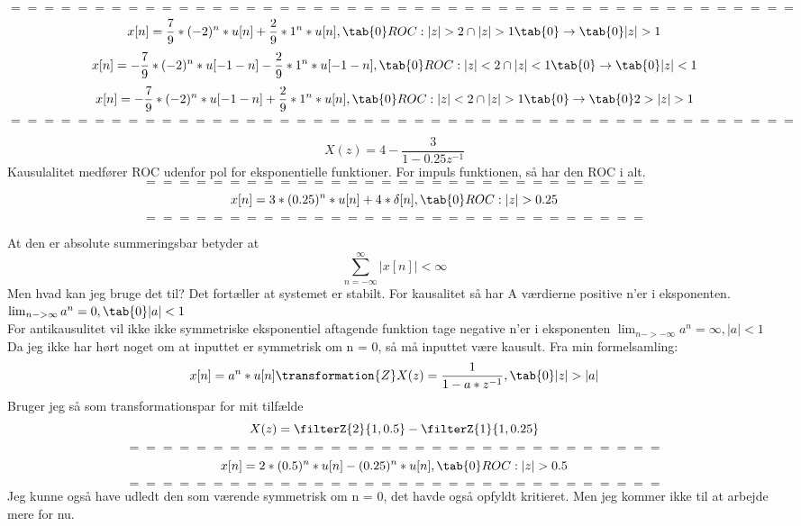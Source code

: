 \begin{Opgaver}
\begin{kapitel}[Z transformation]
\begin{Opgave}
\begin{UnderOpgave}[\text{$X(z) = \filterZ{1, -1/3}{1, 1, -2}$, Alle ROCs skal findes}]
                \[===============================================\] 
                \[x[n] = \frac{7}{9} * (-2)^n * u[n]        + \frac{2}{9} * 1^n * u[n]   , \tab{0} ROC: |z| > 2 \cap |z| > 1 \tab{0} \rightarrow \tab{0} |z| > 1\]
                \[x[n] = -\frac{7}{9} * (-2)^n * u[-1 -n]   - \frac{2}{9} * 1^n * u[-1-n], \tab{0} ROC: |z| < 2 \cap |z| < 1 \tab{0} \rightarrow \tab{0} |z| < 1\]
                \[x[n] = -\frac{7}{9} * (-2)^n * u[-1 -n]   + \frac{2}{9} * 1^n * u[n]   , \tab{0} ROC: |z| < 2 \cap |z| > 1 \tab{0} \rightarrow \tab{0} 2 > |z| > 1\]
                \[===============================================\] 
            \end{UnderOpgave}
            \begin{UnderOpgave}[\text{$X(z) = \filterZ{1, -1}{1, -0.25}, \tab{0} x[n]$ er kausul.}]
                \[X(z) = 4 - \frac{3}{1 -0.25z^{-1}}\]
                Kausulalitet medfører ROC udenfor pol for eksponentielle funktioner. For impuls funktionen, så har den ROC i alt. 
                \[==============================\]
                \[x[n] = 3*(0.25)^n*u[n] + 4 * \delta[n], \tab{0} ROC: |z| > 0.25\]
                \[==============================\]
            \end{UnderOpgave}
            \begin{UnderOpgave}[\text{$X(z) = \frac{1}{(1 - 0.5z^{-1})*(1 - 0.25z^{-1})}, \tab{0} x[n]$ er absolute summable}]
                At den er absolute summeringsbar betyder at 
                \[\sum_{n=-\infty}^{\infty} |x[n]| < \infty \]
                Men hvad kan jeg bruge det til? Det fortæller at systemet er stabilt. 
                For kausalitet så har A værdierne positive n'er i eksponenten. $\lim_{n->\infty}{a^n} = 0, \tab{0} |a| < 1$ \\
                For antikausulitet vil ikke ikke symmetriske eksponentiel aftagende funktion tage negative n'er i eksponenten $\lim_{n->-\infty}{a^n} = \infty, |a| < 1$ \\
                Da jeg ikke har hørt noget om at inputtet er symmetrisk om n = 0, så må inputtet være kausult. 
                Fra min formelsamling: 
                \[x[n] = a^n*u[n] \transformation{Z} X(z) = \frac{1}{1 - a*z^{-1}}, \tab{0} |z| > |a|                                          \]
                Bruger jeg så som transformationspar for mit tilfælde
                \[X(z) = \filterZ{2}{1, 0.5} - \filterZ{1}{1, 0.25}\]
                \[================================\]
                \[x[n] = 2*(0.5)^n * u[n] - (0.25)^n * u[n], \tab{0} ROC: |z| > 0.5\]
                \[================================\]
                Jeg kunne også have udledt den som værende symmetrisk om n = 0, det havde også opfyldt kritieret. Men jeg kommer ikke til at arbejde mere for nu.
            \end{UnderOpgave}
        \end{Opgave}
        

\end{kapitel}
\end{Opgaver}
